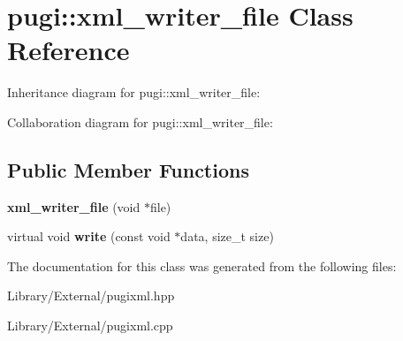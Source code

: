 \hypertarget{classpugi_1_1xml__writer__file}{}\section{pugi\+:\+:xml\+\_\+writer\+\_\+file Class Reference}
\label{classpugi_1_1xml__writer__file}


Inheritance diagram for pugi\+:\+:xml\+\_\+writer\+\_\+file\+:


Collaboration diagram for pugi\+:\+:xml\+\_\+writer\+\_\+file\+:
\subsection*{Public Member Functions}
\begin{DoxyCompactItemize}
\item 
\hypertarget{classpugi_1_1xml__writer__file_a458afaf5231f88e182fa16b13fc2b0a6}{}{\bfseries xml\+\_\+writer\+\_\+file} (void $\ast$file)\label{classpugi_1_1xml__writer__file_a458afaf5231f88e182fa16b13fc2b0a6}

\item 
\hypertarget{classpugi_1_1xml__writer__file_a228a6e448d8fdbc155032e6eab5d86ed}{}virtual void {\bfseries write} (const void $\ast$data, size\+\_\+t size)\label{classpugi_1_1xml__writer__file_a228a6e448d8fdbc155032e6eab5d86ed}

\end{DoxyCompactItemize}


The documentation for this class was generated from the following files\+:\begin{DoxyCompactItemize}
\item 
Library/\+External/pugixml.\+hpp\item 
Library/\+External/pugixml.\+cpp\end{DoxyCompactItemize}
